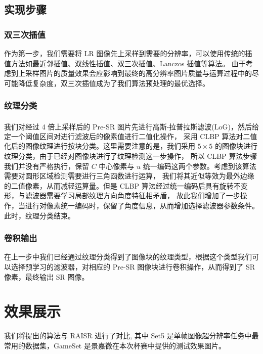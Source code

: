 \documentclass[12pt, a4paper, oneside]{ctexbook}
\begin{document}
	\subsection{实现步骤}
	\subsubsection{双三次插值}
	作为第一步，我们需要将 LR 图像先上采样到需要的分辨率，可以使用传统的插值方法如最近邻插值、双线性插值、双三次插值、Lanczos 插值等算法。
	由于考虑到上采样图片的质量效果会应影响到最终的高分辨率图片质量与运算过程中的尽可能降低复杂度，双三次插值成为了我们算法预处理的最优选择。
	\subsubsection{纹理分类}
	我们对经过 4 倍上采样后的 Pre-SR 图片先进行高斯-拉普拉斯滤波(LoG)\textsuperscript{\cite{12}}，然后给定一个阈值区间对进行滤波后的像素值进行二值化操作，
	采用 CLBP 算法对二值化后的图像纹理进行按块分类。这里需要注意的是，我们采用 $5 \times 5$ 的图像块进行纹理分类，由于已经对图像块进行了纹理检测这一步操作，
	所以 CLBP 算法步骤我们并没有严格执行，保留 $C$ 中心像素与 $u$ 统一编码这两个参数。考虑到该算法需要对圆形区域检测需要进行三角函数进行运算，
	我们将其近似等效为最外边缘的二值像素，从而减轻运算量。但是 CLBP 算法经过统一编码后具有旋转不变形，与滤波器需要学习局部纹理方向角度特征相矛盾，
	故此我们增加了一步操作，当进行对像素统一编码时，保留了角度信息，从而增加选择滤波器参数条件。此时，纹理分类结束。
	\subsubsection{卷积输出}
	在上一步中我们已经通过纹理分类得到了图像块的纹理类型，根据这个类型我们可以选择预学习的滤波器，对相应的 Pre-SR 图像块进行卷积操作，从而得到了 SR 像素，最终输出 SR 图像。
	
	\section{效果展示}
	我们将提出的算法与 RAISR 进行了对比,	其中 Set5 是单帧图像超分辨率任务中最常用的数据集，GameSet 是景嘉微在本次杯赛中提供的测试效果图片。
	
\end{document}
